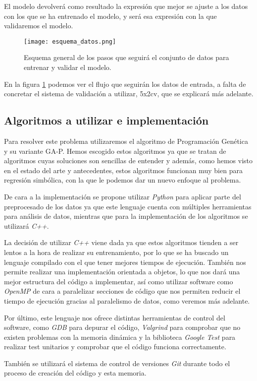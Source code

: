 El modelo devolverá como resultado la expresión que mejor se ajuste a los datos con los que se ha entrenado el modelo, y será esa expresión con la que validaremos el modelo.

\begin{figure}[H]
    \centering
	  \texttt{[image: esquema\_datos.png]}
    \caption{Esquema general de los pasos que seguirá el conjunto de datos para entrenar y validar el modelo.}
	 \label{fig:esquema_datos}
\end{figure}

En la figura \ref{fig:esquema_datos} podemos ver el flujo que seguirán los datos de entrada, a falta de concretar el sistema de validación a utilizar, 5x2cv, que se explicará más adelante.

\newpage

\subsection{Algoritmos a utilizar e implementación}

Para resolver este problema utilizaremos el algoritmo de Programación Genética y su variante GA-P. Hemos escogido estos algoritmos ya que se tratan de algoritmos cuyas soluciones son sencillas de entender y además, como hemos visto en el estado del arte y antecedentes, estos algoritmos funcionan muy bien para regresión simbólica, con la que le podemos dar un nuevo enfoque al problema.

De cara a la implementación se propone utilizar \textit{Python} para aplicar parte del preprocesado de los datos ya que este lenguaje cuenta con múltiples herramientas para análisis de datos, mientras que para la implementación de los algoritmos se utilizará \textit{C++}.

La decisión de utilizar \textit{C++} viene dada ya que estos algoritmos tienden a ser lentos a la hora de realizar su entrenamiento, por lo que se ha buscado un lenguaje compilado con el que tener mejores tiempos de ejecución. También nos permite realizar una implementación orientada a objetos, lo que nos dará una mejor estructura del código a implementar, así como utilizar software como \textit{OpenMP} \cite{OpenMP} de cara a paralelizar secciones de código que nos permiten reducir el tiempo de ejecución gracias al paralelismo de datos, como veremos más adelante.

Por último, este lenguaje nos ofrece distintas herramientas de control del software, como \textit{GDB} \cite{gdb} para depurar el código, \textit{Valgrind} \cite{valgrind} para comprobar que no existen problemas con la memoria dinámica y la biblioteca \textit{Google Test} \cite{gtest} para realizar test unitarios y comprobar que el código funciona correctamente.

También se utilizará el sistema de control de versiones \textit{Git} \cite{git} durante todo el proceso de creación del código y esta memoria.


\newpage
